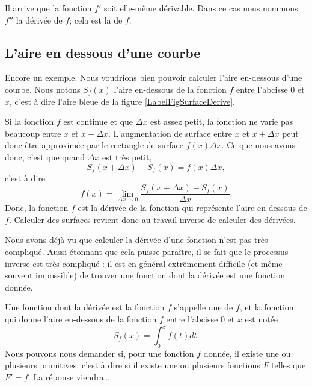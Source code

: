 Il arrive que la fonction $f'$ soit elle-même dérivable. Dans ce cas nous nommons $f''$ la dérivée de $f$; cela est la  de $f$.

\subsection{L'aire en dessous d'une courbe}		\label{SubSecAirePrimInto}

Encore un exemple. Nous voudrions bien pouvoir calculer l'aire en-dessous d'une courbe. Nous notons $S_f(x)$ l'aire en-dessous de la fonction $f$ entre l'abcisse $0$ et $x$, c'est à dire l'aire bleue de la figure \ref{LabelFigSurfaceDerive}. 

\newcommand{\CaptionFigSurfaceDerive}{L'aire en dessous d'une courbe. Le rectangle rouge d'aire $f(x)\Delta x$ approxime de combien la surface augmente lorsqu'on passe de $x$ à $x+\Delta x$.}



Si la fonction $f$ est continue et que $\Delta x$ est assez petit, la fonction ne varie pas beaucoup entre $x$ et $x+\Delta x$. L'augmentation de surface entre $x$ et $x+\Delta x$ peut donc être approximée par le rectangle de surface $f(x)\Delta x$. Ce que nous avons donc, c'est que quand $\Delta x$ est très petit,
\begin{equation}
	S_f(x+\Delta x)-S_f(x)=f(x)\Delta x,
\end{equation}
c'est à dire
\begin{equation}
	f(x)=\lim_{\Delta x\to 0}\frac{  S_f(x+\Delta x)-S_f(x)}{ \Delta x }.
\end{equation}
Donc, la fonction $f$ est la dérivée de la fonction qui représente l'aire en-dessous de $f$. Calculer des surfaces revient donc au travail inverse de calculer des dérivées.

Nous avons déjà vu que calculer la dérivée d'une fonction n'est pas très compliqué. Aussi étonnant que cela puisse paraître, il se fait que le processus inverse est très compliqué : il est en général extrêmement difficile (et même souvent impossible) de trouver une fonction dont la dérivée est une fonction donnée.

Une fonction dont la dérivée est la fonction $f$ s'appelle une  de $f$, et la fonction qui donne l'aire en-dessous de la fonction $f$ entre l'abcisse $0$ et $x$ est notée
\begin{equation}
	S_f(x)=\int_0^xf(t)dt.
\end{equation}
Nous pouvons nous demander si, pour une fonction $f$ donnée, il existe une ou plusieurs primitives, c'est à dire si il existe une ou plusieurs fonctions $F$ telles que $F'=f$. La réponse viendra\ldots


